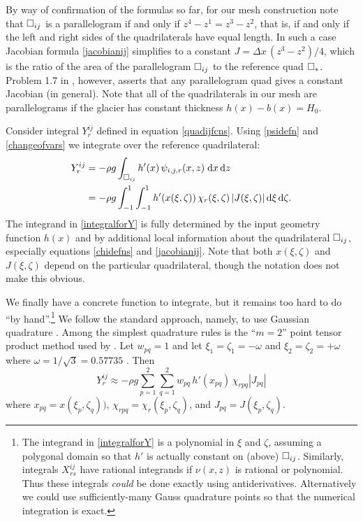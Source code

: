 \documentclass[11pt,final,reqno]{amsart}
\theoremstyle{remark}
\theoremstyle{definition}
\begin{document}
By way of confirmation of the formulas so far, for our mesh construction note that $\square_{ij}$ is a parallelogram if and only if $z^4-z^1=z^3-z^2$, that is, if and only if the left and right sides of the quadrilaterals have equal length.  In such a case Jacobian formula \eqref{jacobianij} simplifies to a constant $J = \Delta x\,(z^3 - z^2) / 4$, which is the ratio of the area of the parallelogram $\square_{ij}$ to the reference quad $\square_{\ast}$.  Problem 1.7 in \cite{Elmanetal2005}, however, asserts that any parallelogram quad gives a constant Jacobian (in general).  Note that all of the quadrilaterals in our mesh are parallelograms if the glacier has constant thickness $h(x)-b(x)=H_0$.

\newcommand{\Jdd}{\,|J(\xi,\zeta)|\dxidzeta}
\newcommand{\Jpq}{J(\xi_p,\zeta_q)}

Consider integral $Y^{ij}_r$ defined in equation \eqref{quadijfcns}.  Using \eqref{psidefn} and \eqref{changeofvars} we integrate over the reference quadrilateral:
\begin{align}
  Y^{ij}_r &= -\rho g \int_{\quadij} h'(x)\,\psi_{i,j,r}(x,z) \dxdz \notag \\
           &= -\rho g \int_{-1}^1 \int_{-1}^1 h'(x(\xi,\zeta))\,\chi_r(\xi,\zeta) \Jdd. \label{integralforY}
\end{align}
The integrand in \eqref{integralforY} is fully determined by the input geometry function $h(x)$ and by additional local information about the quadrilateral $\square_{ij}$, especially equations \eqref{chidefns} and \eqref{jacobianij}.  Note that both $x(\xi,\zeta)$ and $J(\xi,\zeta)$ depend on the particular quadrilateral, though the notation does not make this obvious.

We finally have a concrete function to integrate, but it remains too hard to do ``by hand''.\footnote{The integrand in \eqref{integralforY} is a polynomial in $\xi$ and $\zeta$, assuming a polygonal domain so that $h'$ is actually constant on (above) $\square_{ij}$.  Similarly, integrals $X^{ij}_{rs}$ have rational integrands if $\nu(x,z)$ is rational or polynomial.  Thus these integrals \emph{could} be done exactly using antiderivatives.  Alternatively we could use sufficiently-many Gauss quadrature points so that the numerical integration is exact.}  We follow the standard approach, namely, to use Gaussian quadrature \cite[subsection 1.4.2]{Elmanetal2005}.  Among the simplest quadrature rules is the ``$m=2$'' point tensor product method used by \cite{BrownSmithAhmadia2013}.  Let $w_{pq}=1$ and let $\xi_1=\zeta_1=-\omega$ and $\xi_2=\zeta_2=+\omega$ where $\omega=1/\sqrt{3}=0.57735$ \cite[compare $m=2$ cases of Figure 1.15 and formula (1.52)]{Elmanetal2005}.  Then
\begin{equation}
  Y^{ij}_r \approx -\rho g \sum_{p=1}^2 \sum_{q=1}^2 w_{pq}\, h'(x_{pq})\,\chi_{rpq} |J_{pq}| \label{Yapprox}
\end{equation}
where $x_{pq} = x(\xi_p,\zeta_q))$, $\chi_{rpq} = \chi_r(\xi_p,\zeta_q)$, and $J_{pq}=\Jpq$.
\end{document}
